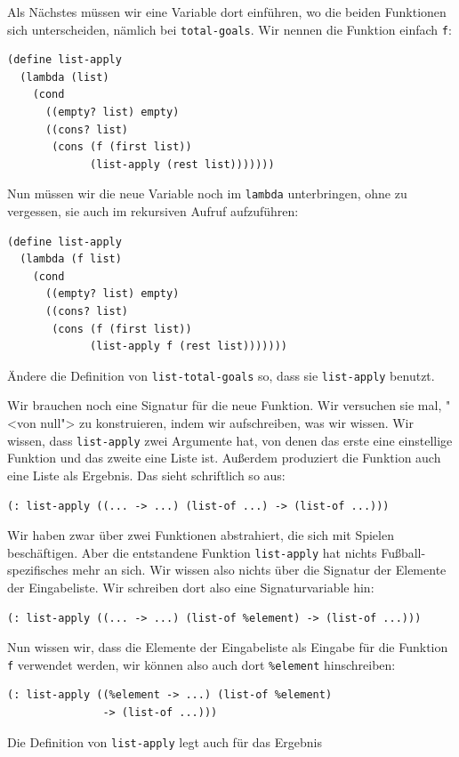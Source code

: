 Als Nächstes müssen wir eine Variable dort einführen, wo die beiden
Funktionen sich unterscheiden, nämlich bei \lstinline{total-goals}.
Wir nennen die Funktion einfach \lstinline{f}:
%
\begin{lstlisting}
(define list-apply
  (lambda (list)
    (cond
      ((empty? list) empty)
      ((cons? list)
       (cons (f (first list))
             (list-apply (rest list)))))))  
\end{lstlisting}
%
Nun müssen wir die neue Variable noch im \lstinline{lambda}
unterbringen, ohne zu vergessen, sie auch im rekursiven Aufruf
aufzuführen:
%
\begin{lstlisting}
(define list-apply
  (lambda (f list)
    (cond
      ((empty? list) empty)
      ((cons? list)
       (cons (f (first list))
             (list-apply f (rest list)))))))
\end{lstlisting}
%
\begin{aufgabeinline}
  Ändere die Definition von \lstinline{list-total-goals} so, dass sie
  \lstinline{list-apply} benutzt.
\end{aufgabeinline}
%
Wir brauchen noch eine Signatur für die neue Funktion.  Wir versuchen
sie mal, "<von null"> zu konstruieren, indem wir aufschreiben, was wir
wissen.  Wir wissen, dass \lstinline{list-apply} zwei Argumente hat,
von denen das erste eine einstellige Funktion und das zweite eine
Liste ist.  Außerdem produziert die Funktion auch eine Liste als
Ergebnis.  Das sieht schriftlich so aus:
%
\begin{lstlisting}
(: list-apply ((... -> ...) (list-of ...) -> (list-of ...)))
\end{lstlisting}
%
Wir haben zwar über zwei Funktionen abstrahiert, die sich mit Spielen
beschäftigen.  Aber die entstandene Funktion \lstinline{list-apply} hat nichts
Fußball-spezifisches mehr an sich.  Wir wissen also nichts über die
Signatur der Elemente der Eingabeliste.  Wir schreiben dort also eine
Signaturvariable hin:
%
\begin{lstlisting}
(: list-apply ((... -> ...) (list-of %element) -> (list-of ...)))
\end{lstlisting}
%
Nun wissen wir, dass die Elemente der Eingabeliste als Eingabe für die
Funktion \lstinline{f} verwendet werden, wir können also auch dort
\lstinline{%element} hinschreiben:
%
\begin{lstlisting}
(: list-apply ((%element -> ...) (list-of %element)
               -> (list-of ...)))
\end{lstlisting}
%
Die Definition von \lstinline{list-apply} legt auch für das Ergebnis
